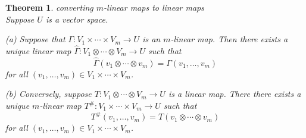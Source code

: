 \documentclass{article}
\newtheorem{theorem}{Theorem}[subsection]
\begin{document}
\begin{CJK}{UTF8}{gkai}
\begin{theorem}
    converting $m$-linear maps to linear maps\\

    Suppose $U$ is a vector space.

    (a) Suppose that $\Gamma: V_1 \times \cdots\times V_m \to U$ is an $m$-linear map. Then there exists a unique linear map $\hat{\Gamma}: V_1 \otimes \cdots\otimes V_m \to U$ such that
    \[\hat{\Gamma}(v_1 \otimes\cdots\otimes v_m) = \Gamma(v_1,\ldots,v_m)\]
    for all $(v_1,\ldots,v_m) \in V_1 \times \cdots\times V_m$.

    (b) Conversely, suppose $T: V_1 \otimes \cdots \otimes V_m \to U$ is a linear map. There there exists a unique $m$-linear map $T^{\#}: V_1 \times \cdots \times V_m \to U$ such that
    \[T^{\#}(v_1,\ldots,v_m) = T(v_1 \otimes\cdots\otimes v_m)\]
    for all $(v_1,\ldots,v_m) \in V_1 \times \cdots\times V_m$.
\end{theorem}

\end{CJK}
\end{document}

